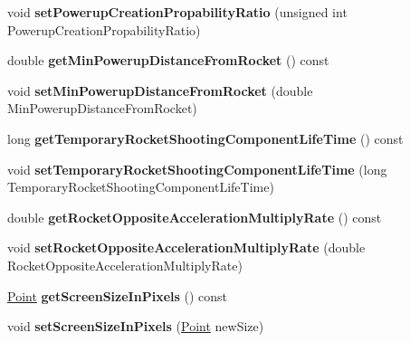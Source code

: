 \begin{DoxyCompactItemize}
\item 
void {\bfseries set\+Powerup\+Creation\+Propability\+Ratio} (unsigned int Powerup\+Creation\+Propability\+Ratio)\hypertarget{classGameConfiguration_a34c382af839fbddb58b398e74e7c27df}{}\label{classGameConfiguration_a34c382af839fbddb58b398e74e7c27df}

\item 
double {\bfseries get\+Min\+Powerup\+Distance\+From\+Rocket} () const \hypertarget{classGameConfiguration_ad1fa18ceed8ed716434aa156b8709761}{}\label{classGameConfiguration_ad1fa18ceed8ed716434aa156b8709761}

\item 
void {\bfseries set\+Min\+Powerup\+Distance\+From\+Rocket} (double Min\+Powerup\+Distance\+From\+Rocket)\hypertarget{classGameConfiguration_a6fb61fbbaea4bbd78e1a4cf2567a461a}{}\label{classGameConfiguration_a6fb61fbbaea4bbd78e1a4cf2567a461a}

\item 
long {\bfseries get\+Temporary\+Rocket\+Shooting\+Component\+Life\+Time} () const \hypertarget{classGameConfiguration_a2e8ed0c3ffb513a5e3d64823cf7edb1f}{}\label{classGameConfiguration_a2e8ed0c3ffb513a5e3d64823cf7edb1f}

\item 
void {\bfseries set\+Temporary\+Rocket\+Shooting\+Component\+Life\+Time} (long Temporary\+Rocket\+Shooting\+Component\+Life\+Time)\hypertarget{classGameConfiguration_ae1640ac78f5c4079e85df7c6de0fc269}{}\label{classGameConfiguration_ae1640ac78f5c4079e85df7c6de0fc269}

\item 
double {\bfseries get\+Rocket\+Opposite\+Acceleration\+Multiply\+Rate} () const \hypertarget{classGameConfiguration_a002bac3f18faca2db44b238e2ca3fc38}{}\label{classGameConfiguration_a002bac3f18faca2db44b238e2ca3fc38}

\item 
void {\bfseries set\+Rocket\+Opposite\+Acceleration\+Multiply\+Rate} (double Rocket\+Opposite\+Acceleration\+Multiply\+Rate)\hypertarget{classGameConfiguration_aef5ea973357aba6f6e7909c15b5cc489}{}\label{classGameConfiguration_aef5ea973357aba6f6e7909c15b5cc489}

\item 
\hyperlink{classPoint}{Point} {\bfseries get\+Screen\+Size\+In\+Pixels} () const \hypertarget{classGameConfiguration_a3fd31a20d1dc67bad75a97a565ae24db}{}\label{classGameConfiguration_a3fd31a20d1dc67bad75a97a565ae24db}

\item 
void {\bfseries set\+Screen\+Size\+In\+Pixels} (\hyperlink{classPoint}{Point} new\+Size)\hypertarget{classGameConfiguration_aab19b78782deebf894c620221e191d7e}{}\label{classGameConfiguration_aab19b78782deebf894c620221e191d7e}


\end{DoxyCompactItemize}
